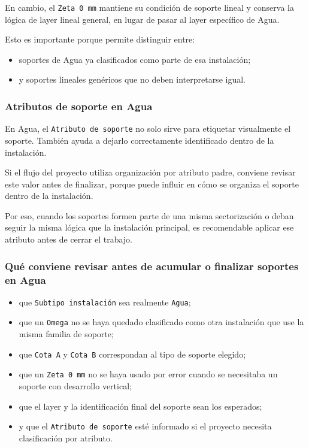 En cambio, el \texttt{Zeta 0 mm} mantiene su condición de soporte lineal y conserva la lógica de layer lineal general, en lugar de pasar al layer específico de Agua.

Esto es importante porque permite distinguir entre:

\begin{itemize}
\item soportes de Agua ya clasificados como parte de esa instalación;
\item y soportes lineales genéricos que no deben interpretarse igual.
\end{itemize}


\subsubsection{Atributos de soporte en Agua}

En Agua, el \texttt{Atributo de soporte} no solo sirve para etiquetar visualmente el soporte. También ayuda a dejarlo correctamente identificado dentro de la instalación.

Si el flujo del proyecto utiliza organización por atributo padre, conviene revisar este valor antes de finalizar, porque puede influir en cómo se organiza el soporte dentro de la instalación.

Por eso, cuando los soportes formen parte de una misma sectorización o deban seguir la misma lógica que la instalación principal, es recomendable aplicar ese atributo antes de cerrar el trabajo.

\subsubsection{Qué conviene revisar antes de acumular o finalizar soportes en Agua}

\begin{itemize}
\item que \texttt{Subtipo instalación} sea realmente \texttt{Agua};
\item que un \texttt{Omega} no se haya quedado clasificado como otra instalación que use la misma familia de soporte;
\item que \texttt{Cota A} y \texttt{Cota B} correspondan al tipo de soporte elegido;
\item que un \texttt{Zeta 0 mm} no se haya usado por error cuando se necesitaba un soporte con desarrollo vertical;
\item que el layer y la identificación final del soporte sean los esperados;
\item y que el \texttt{Atributo de soporte} esté informado si el proyecto necesita clasificación por atributo.
\end{itemize}

